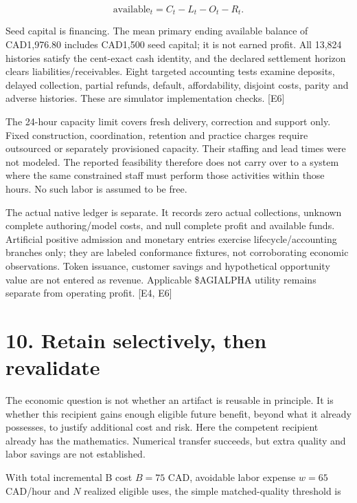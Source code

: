 \documentclass[10pt,a4paper]{article}
\begin{document}
\[
\text{available}_t=C_t-L_t-O_t-R_t.
\]

Seed capital is financing. The mean primary ending available balance of
CAD1,976.80 includes CAD1,500 seed capital; it is not earned profit. All
13,824 histories satisfy the cent-exact cash identity, and the declared
settlement horizon clears liabilities/receivables. Eight targeted
accounting tests examine deposits, delayed collection, partial refunds,
default, affordability, disjoint costs, parity and adverse histories.
These are simulator implementation checks. {[}E6{]}

The 24-hour capacity limit covers fresh delivery, correction and support
only. Fixed construction, coordination, retention and practice charges
require outsourced or separately provisioned capacity. Their staffing
and lead times were not modeled. The reported feasibility therefore does
not carry over to a system where the same constrained staff must perform
those activities within those hours. No such labor is assumed to be
free.

The actual native ledger is separate. It records zero actual
collections, unknown complete authoring/model costs, and null complete
profit and available funds. Artificial positive admission and monetary
entries exercise lifecycle/accounting branches only; they are labeled
conformance fixtures, not corroborating economic observations. Token
issuance, customer savings and hypothetical opportunity value are not
entered as revenue. Applicable \$AGIALPHA utility remains separate from
operating profit. {[}E4, E6{]}

\clearpage

\hypertarget{retain-selectively-then-revalidate}{%
\section{10. Retain selectively, then
revalidate}\label{retain-selectively-then-revalidate}}

The economic question is not whether an artifact is reusable in
principle. It is whether this recipient gains enough eligible future
benefit, beyond what it already possesses, to justify additional cost
and risk. Here the competent recipient already has the mathematics.
Numerical transfer succeeds, but extra quality and labor savings are not
established.

With total incremental B cost \(B=75\) CAD, avoidable labor expense
\(w=65\) CAD/hour and \(N\) realized eligible uses, the simple
matched-quality threshold is
\end{document}
